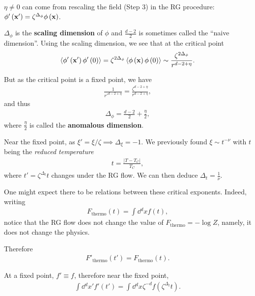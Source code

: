 $\eta \neq 0$ can come from rescaling the field (Step 3) in the RG procedure: $\phi' \left( \vb{x}' \right) = \zeta^{\Delta_\phi} \phi \left( \vb{x} \right) $.

$\Delta_\phi$ is the \textbf{scaling dimension} of $\phi$ and $\frac{d-2}{2}$ is sometimes called the ``naive dimension''. Using the scaling dimension, we see that at the critical point
\begin{align}
    \left<\phi' \left( \vb{x}' \right) \phi' \left( 0 \right)  \right> = \zeta^{2 \Delta_\phi} \left<\phi \left( \vb{x} \right)\phi \left( 0 \right)    \right> \sim  \frac{\zeta^{2 \Delta_\phi}}{r^{d-2+\eta}}
.\end{align}

But as the critical point is a fixed point, we have
\begin{align}
    \frac{1}{r'^{d - 2 + \eta}} = \frac{\zeta^{d-2+\eta}}{r^{d-2+\eta}}
,\end{align}
and thus
\begin{align}
    \Delta_{\phi} = \frac{d-2}{2} + \frac{\eta}{2}
,\end{align}
where $\frac{\eta}{2}$ is called the \textbf{anomalous dimension}.


Near the fixed point, as $\xi' = \xi / \zeta \implies \Delta_{\xi} = -1$. We previously found $\xi \sim  t^{-\nu}$ with $t$ being the \textit{reduced temperature}
\begin{align}
    t = \frac{\left| T - T_C \right| }{T_C}
,\end{align}
where $t' = \zeta^{\Delta_t} t$ changes under the RG flow. We can then deduce $\Delta_t = \frac{1}{\nu}$.

One might expect there to be relations between these critical exponents. Indeed, writing
\begin{align}
    F_\text{thermo}\left( t \right) = \int \dd{^{d}x} f\left( t \right) 
,\end{align}
notice that the RG flow does not change the value of $F_\text{thermo} = - \log Z$, namely, it does not change the physics.

Therefore
\begin{align}
    F'_\text{thermo}\left( t' \right) = F_\text{thermo}\left( t \right) 
.\end{align}

At a fixed point, $f' \equiv f$, therefore near the fixed point,
\begin{align}
    \int \dd{^{d}x'} f' \left( t' \right) = \int \dd{^{d}x} \zeta^{-d} f\left( \zeta^{\Delta_t} t \right) 
.\end{align}

